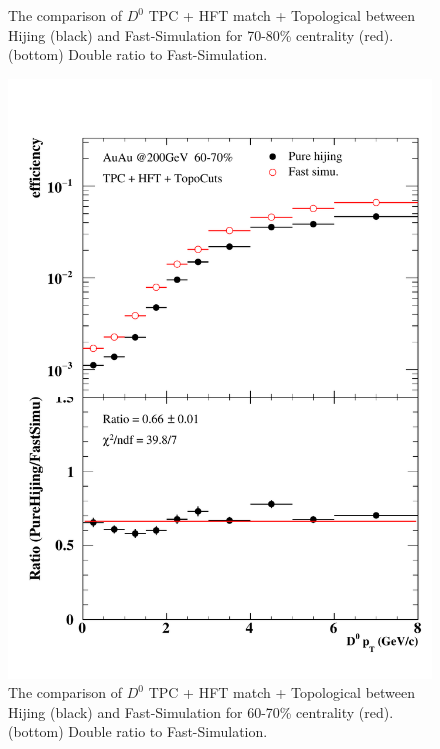 \begin{figure}[htbp]
\begin{minipage}[htbp]{0.47\linewidth}
\caption{ The comparison of $D^0$ TPC + HFT match + Topological between Hijing (black) and Fast-Simulation for 70-80\% centrality (red). (bottom) Double ratio to Fast-Simulation.\label{70_80}}
\end{minipage}
\hfill
\begin{minipage}[htbp]{0.47\linewidth}
\centering
\includegraphics[width=1.0\textwidth,angle=0]{figure/Run14_D0HFT/60_70.pdf} 
\caption{ The comparison of $D^0$ TPC + HFT match + Topological between Hijing (black) and Fast-Simulation for 60-70\% centrality (red). (bottom) Double ratio to Fast-Simulation.\label{60_70}}
\end{minipage}
\end{figure}

